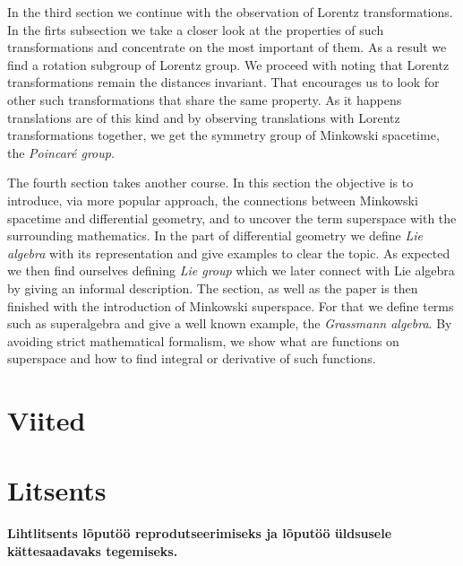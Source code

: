 \documentclass[12pt,a4paper,oneside]{article}
\theoremstyle{plain}
\theoremstyle{definition}
\numberwithin{equation}{section}
\renewcommand\refname{Viited}
\begin{document}
In the third section we continue with the observation 
of Lorentz transformations. In the firts subsection we 
take a closer look at the properties of such 
transformations and concentrate on the most important of 
them. As a result we find a rotation subgroup of Lorentz 
group. We proceed with noting that Lorentz transformations 
remain the distances invariant. That encourages us to 
look for other such transformations that share the same 
property. As it happens translations are of this kind and 
by observing translations with Lorentz transformations 
together, we get the symmetry group of Minkowski spacetime, 
the \emph{Poincar\'e group}.

The fourth section takes another course. In this section 
the objective is to introduce, via more popular approach, 
the connections between Minkowski spacetime and 
differential geometry, and to uncover the term superspace 
with the surrounding mathematics. In the part of 
differential geometry we define \emph{Lie algebra} with 
its representation and give examples to 
clear the topic. As expected we then find ourselves 
defining \emph{Lie group} which we later connect with 
Lie algebra by giving an informal description. The section,
as well as the paper is then finished with the 
introduction of Minkowski superspace. For that we define 
terms such as superalgebra and give a well known example, 
the \emph{Grassmann algebra}. By avoiding strict 
mathematical formalism, we show what are functions on 
superspace and how to find integral or derivative of such 
functions.

\newpage

\renewcommand{\refname}{}
\section*{Viited}


\newpage
\pagestyle{empty}
\section*{Litsents}

\textbf{Lihtlitsents lõputöö reprodutseerimiseks ja 
	lõputöö üldsusele kätte\-saadavaks tegemiseks.}
\end{document}
